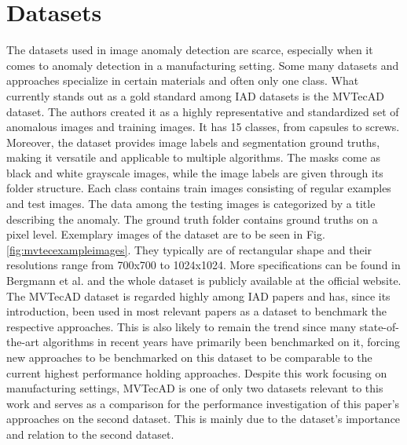 \section{Datasets}
\label{sec:datasets}
The datasets used in image anomaly detection are scarce, especially when it comes to anomaly detection in a manufacturing setting. Some many datasets and approaches specialize in certain materials \cite{FabricDataset_Tsang_2016} 
\cite{SteeltubeDataset_Yang_2021} \cite{magnetictiles_Huang_2018}
and often only one class. What currently stands out as a gold standard among IAD datasets is the MVTecAD \cite{MVTEC_Bergmann_2021} dataset. The authors created it 
as a highly representative and standardized set of anomalous images and training images. It has 15 classes, from capsules to screws. Moreover, the dataset provides image labels and segmentation 
ground truths, making it versatile and applicable to multiple algorithms. The masks come as black and white grayscale images, while the image labels are given through its folder structure. 
Each class contains train images consisting of regular examples 
and test images. The data among the testing images is categorized by a title describing the anomaly. The ground truth folder contains 
ground truths on a pixel level.\newline
Exemplary images of the dataset are to be seen in Fig. \ref{fig:mvtecexampleimages}. They typically are of rectangular shape and their resolutions range from 
700x700 to 1024x1024. More specifications can be found in Bergmann et al. \cite{MVTEC_Bergmann_2021} and the whole dataset is publicly available at the official website\cite{mvtecaddownload}.\newline
The MVTecAD\cite{MVTEC_Bergmann_2021} dataset is regarded highly among IAD papers and has, since its introduction, been used in most relevant papers as a dataset 
to benchmark the respective approaches. This is also likely to remain the trend since many state-of-the-art algorithms in recent years have primarily been benchmarked on it, forcing new approaches 
to be benchmarked on this dataset to be comparable to the current highest performance holding approaches. Despite this work focusing on manufacturing settings, MVTecAD is one of only two datasets relevant to this work 
and serves as a comparison for the performance investigation of this paper's approaches on the second dataset. This is mainly due to the dataset's importance and 
relation to the second dataset.



